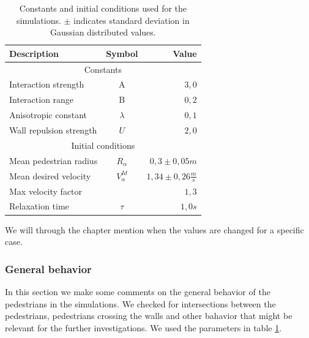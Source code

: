 \begin{table}[ht]
    \begin{center}
        \begin{tabular}{l c r}
            \toprule
            \textbf{Description} & \textbf{Symbol} & \textbf{Value} \\
            \midrule
            \multicolumn{3}{c}{\textsf{Constants}}\\
            Interaction strength & A & $3,0$ \\
            Interaction range & B & $0,2$ \\
            Anisotropic constant & $\lambda$ & $0,1$ \\
            Wall repulsion strength & $U$ &  $2,0$ \\
            \midrule
            \multicolumn{3}{c}{\textsf{Initial conditions}}\\
            Mean pedestrian radius & $R_\alpha$ & $0,3 \pm 0,05 m$\\
            Mean desired velocity &  $V^{Id}_\alpha$ &  $1,34 \pm 0,26 
            \frac{m}{s}$ \\
            Max velocity factor &  &  $1,3$ \\
            Relaxation time & $\tau$ & $1,0 s$\\
            \bottomrule
        \end{tabular}
        \caption[Constants and initial conditions]{Constants and initial 
        conditions used for the simulations. $\pm$ indicates standard 
        deviation in Gaussian distributed values.}
        \label{tbl:parameter-settings}
    \end{center}
\end{table}

We will through the chapter mention when the values are changed for a 
specific case.  

\subsubsection{General behavior}
In this section we make some comments on the general behavior of 
the pedestrians in the simulations. We checked for intersections between 
the pedestrians, pedestrians crossing the walls and other bahavior that might 
be relevant for the further investigations. We used the parameters in table 
\ref{tbl:parameter-settings}.\\

